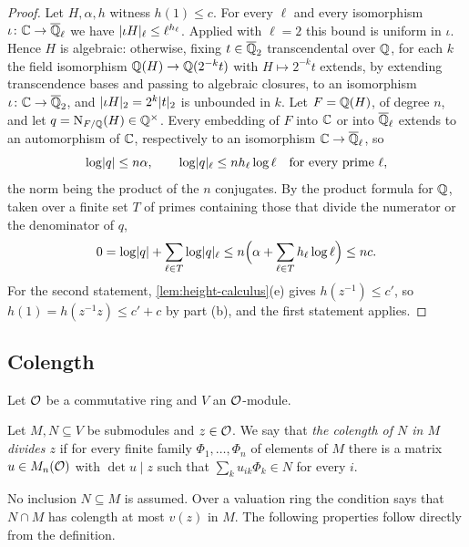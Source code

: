 \begin{proof}
Let $H,\alpha,h$ witness $h(1)\le c$. For every $\ell$ and every isomorphism $\iota\colon\mathbb{C}\to\overline{\mathbb{Q}}_\ell$
we have $\lvert \iota H\rvert_\ell\le\ell^{h_\ell}$. Applied with $\ell=2$ this bound is uniform in $\iota$.
Hence $H$ is algebraic: otherwise, fixing $t\in\overline{\mathbb{Q}}_2$ transcendental over $\mathbb{Q}$, for each
$k$ the field isomorphism $\mathbb{Q}(H)\to\mathbb{Q}(2^{-k}t)$ with $H\mapsto2^{-k}t$ extends, by extending
transcendence bases and passing to algebraic closures, to an isomorphism $\iota\colon\mathbb{C}\to
\overline{\mathbb{Q}}_2$, and $\lvert \iota H\rvert_2=2^k\lvert t\rvert_2$ is unbounded in $k$. Let
$F=\mathbb{Q}(H)$, of degree $n$, and let $q=\operatorname{N}_{F/\mathbb{Q}}(H)\in\mathbb{Q}^\times$. Every embedding of $F$ into $\mathbb{C}$ or
into $\overline{\mathbb{Q}}_\ell$ extends to an automorphism of $\mathbb{C}$, respectively to an isomorphism $\mathbb{C}\to\overline{\mathbb{Q}}_\ell$, so
\[
  \log\lvert q\rvert\le n\alpha,\qquad \log\lvert q\rvert_\ell\le nh_\ell\log\ell\quad\text{for every prime }\ell,
\]
the norm being the product of the $n$ conjugates. By the product formula for $\mathbb{Q}$, taken over a finite
set $T$ of primes containing those that divide the numerator or the denominator of $q$,
\[
  0=\log\lvert q\rvert+\sum_{\ell\in T}\log\lvert q\rvert_\ell\le n\Bigl(\alpha+\sum_{\ell\in T}h_\ell\log\ell\Bigr)
  \le nc.
\]
For the second statement, \cref{lem:height-calculus}(e) gives $h(z^{-1})\le c'$, so
$h(1)=h(z^{-1}z)\le c'+c$ by part (b), and the first statement applies.
\end{proof}

\subsection{Colength}\label{ss:colength}
Let $\mathcal{O}$ be a commutative ring and $V$ an $\mathcal{O}$-module.

\begin{definition}\label{def:colength}
Let $M,N\subseteq V$ be submodules and $z\in\mathcal{O}$. We say that \emph{the colength of $N$ in $M$
divides $z$} if for every finite family $\Phi_1,\dots,\Phi_n$ of elements of $M$ there is a matrix
$u\in M_n(\mathcal{O})$ with $\det u\mid z$ such that $\sum_k u_{ik}\Phi_k\in N$ for every $i$.
\end{definition}

No inclusion $N\subseteq M$ is assumed. Over a valuation ring the condition says that $N\cap M$ has
colength at most $v(z)$ in $M$. The following properties follow directly from the definition.

